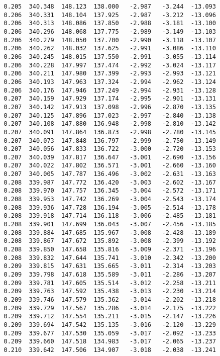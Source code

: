 \begin{verbatim}
   0.205  340.348  148.123  138.000   -2.987   -3.244  -13.093
   0.206  340.331  148.104  137.925   -2.987   -3.212  -13.096
   0.206  340.313  148.086  137.850   -2.988   -3.181  -13.100
   0.206  340.296  148.068  137.775   -2.989   -3.149  -13.103
   0.206  340.279  148.050  137.700   -2.990   -3.118  -13.107
   0.206  340.262  148.032  137.625   -2.991   -3.086  -13.110
   0.206  340.245  148.015  137.550   -2.991   -3.055  -13.114
   0.206  340.228  147.997  137.474   -2.992   -3.024  -13.117
   0.206  340.211  147.980  137.399   -2.993   -2.993  -13.121
   0.206  340.193  147.963  137.324   -2.994   -2.962  -13.124
   0.206  340.176  147.946  137.249   -2.994   -2.931  -13.128
   0.207  340.159  147.929  137.174   -2.995   -2.901  -13.131
   0.207  340.142  147.913  137.098   -2.996   -2.870  -13.135
   0.207  340.125  147.896  137.023   -2.997   -2.840  -13.138
   0.207  340.108  147.880  136.948   -2.998   -2.810  -13.142
   0.207  340.091  147.864  136.873   -2.998   -2.780  -13.145
   0.207  340.073  147.848  136.797   -2.999   -2.750  -13.149
   0.207  340.056  147.833  136.722   -3.000   -2.720  -13.153
   0.207  340.039  147.817  136.647   -3.001   -2.690  -13.156
   0.207  340.022  147.802  136.571   -3.001   -2.660  -13.160
   0.207  340.005  147.787  136.496   -3.002   -2.631  -13.163
   0.208  339.987  147.772  136.420   -3.003   -2.602  -13.167
   0.208  339.970  147.757  136.345   -3.004   -2.572  -13.171
   0.208  339.953  147.742  136.269   -3.004   -2.543  -13.174
   0.208  339.936  147.728  136.194   -3.005   -2.514  -13.178
   0.208  339.918  147.714  136.118   -3.006   -2.485  -13.181
   0.208  339.901  147.699  136.043   -3.007   -2.456  -13.185
   0.208  339.884  147.685  135.967   -3.008   -2.428  -13.189
   0.208  339.867  147.672  135.892   -3.008   -2.399  -13.192
   0.208  339.850  147.658  135.816   -3.009   -2.371  -13.196
   0.208  339.832  147.644  135.741   -3.010   -2.342  -13.200
   0.209  339.815  147.631  135.665   -3.011   -2.314  -13.203
   0.209  339.798  147.618  135.589   -3.011   -2.286  -13.207
   0.209  339.781  147.605  135.514   -3.012   -2.258  -13.211
   0.209  339.763  147.592  135.438   -3.013   -2.230  -13.214
   0.209  339.746  147.579  135.362   -3.014   -2.202  -13.218
   0.209  339.729  147.567  135.286   -3.014   -2.175  -13.222
   0.209  339.712  147.554  135.211   -3.015   -2.147  -13.226
   0.209  339.694  147.542  135.135   -3.016   -2.120  -13.229
   0.209  339.677  147.530  135.059   -3.017   -2.092  -13.233
   0.209  339.660  147.518  134.983   -3.017   -2.065  -13.237
   0.210  339.642  147.506  134.907   -3.018   -2.038  -13.241

\end{verbatim}
